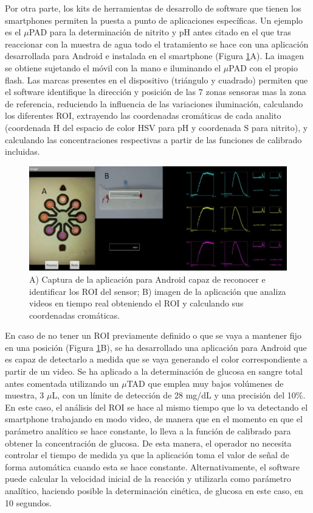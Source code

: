 \documentclass{article}
\begin{document}
Por otra parte, los kits de herramientas de desarrollo de software que tienen los smartphones permiten la puesta a punto de aplicaciones específicas. Un ejemplo es el $\mu$PAD para la determinación de nitrito y pH antes citado\cite{Lopez-Ruiz2014} en el que tras reaccionar con la muestra de agua todo el tratamiento se hace con una aplicación desarrollada para Android  e instalada en el smartphone (Figura \ref{fig:app}A). La imagen se obtiene sujetando el móvil con la mano e iluminando el $\mu$PAD con el propio flash. Las marcas presentes en el dispositivo (triángulo y cuadrado) permiten que el software identifique la dirección y posición de las 7 zonas sensoras mas la zona de referencia, reduciendo la influencia de las variaciones iluminación, calculando los diferentes ROI, extrayendo las coordenadas cromáticas de cada analito (coordenada H del espacio de color HSV para pH y coordenada S para nitrito), y calculando las concentraciones respectivas a partir de las funciones de calibrado incluidas.\\


\begin{figure}[h]
	\includegraphics[width=\textwidth]{app}
	\caption{A) Captura de la aplicación para Android capaz de reconocer e identificar los ROI del sensor; B) imagen de la aplicación que analiza videos en tiempo real obteniendo el ROI y calculando sus coordenadas cromáticas.}
	\label{fig:app}
\end{figure}

En caso de no tener un ROI previamente definido o que se vaya a mantener fijo en una posición (Figura \ref{fig:app}B), se ha desarrollado una aplicación para Android que es capaz de detectarlo a medida que se vaya generando el color correspondiente a partir de un video. Se ha aplicado a la determinación de glucosa en sangre total antes comentada utilizando un $\mu$TAD que emplea muy bajos volúmenes de muestra, 3 $\mu$L, con un límite de detección de 28 mg/dL y una precisión del 10\%. En este caso, el análisis del ROI se hace al mismo tiempo que lo va detectando el smartphone trabajando en modo video, de manera que en el momento en que el parámetro analítico se hace constante, lo lleva a la función de calibrado para obtener la concentración de glucosa. De esta manera, el operador no necesita controlar el tiempo de medida ya que la aplicación toma el valor de señal de forma automática cuando esta se hace constante. Alternativamente, el software puede calcular la velocidad inicial de la reacción y utilizarla como parámetro analítico, haciendo posible la determinación cinética, de glucosa en este caso, en 10 segundos.











	
\end{document}
